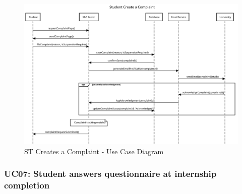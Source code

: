 \begin{figure}[H]
    \centering
    \includegraphics[width=1.0\textwidth]{Images/UC_6.pdf}
    \caption{ST Creates a Complaint - Use Case Diagram}
    \label{fig:use-case-diagram-6}
\end{figure}


\subsubsection{UC07: Student answers questionnaire at internship completion}
\label{subsubsec:student-answers-questionnaire-at-internship-completion}

